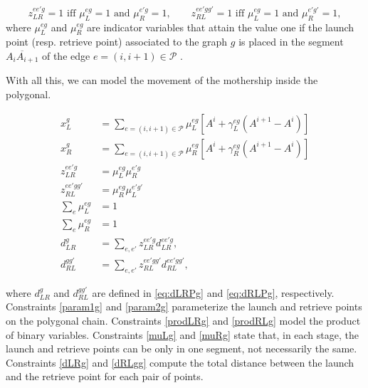 $$z_{LR}^{ee'g} = 1 \text{ iff } \mu_{L}^{eg} = 1 \text{ and }\mu_{R}^{e'g} = 1,\qquad
z_{RL}^{ee'gg'} = 1 \text{ iff } \mu_{L}^{eg} = 1 \text{ and }\mu_{R}^{e'g'} = 1,
$$
where $\mu_{L}^{eg}$ and $\mu_{R}^{eg}$ are indicator variables that attain the value one if the launch point (resp. retrieve point) associated to the graph $g$ is placed in the segment $\overline{A_iA_{i+1}}$ of the edge $e=(i, i+1) \in \mathcal P$ .

With all this, we can model the movement of the mothership inside the polygonal. 

\begin{align}
    x_L^g & = \sum_{e=(i, i+1)\in\mathcal P} \mu_{L}^{eg}\left[A^i + \gamma_L^{eg}(A^{i+1} - A^i)\right]\label{param1g}\\
    x_R^g & = \sum_{e=(i, i+1)\in\mathcal P} \mu_{R}^{eg}\left[ A^i + \gamma_R^{eg}(A^{i+1} - A^i)\right]\label{param2g}\\
    z_{LR}^{ee'g} & = \mu_{L}^{eg}\mu_{R}^{e'g}\label{prodLRg}\\
    z_{RL}^{ee'gg'} & = \mu_{R}^{eg}\mu_{L}^{e'g'}\label{prodRLg}\\
    \sum_{e} \mu_{L}^{eg} & = 1  \label{muLg} \\
    \sum_{e} \mu_{R}^{eg} & = 1 \label{muRg}\\
    d_{LR}^{g} & = \sum_{e, e'} z_{LR}^{ee'g} d_{LR}^{ee'g} \label{dLRg},\\
    d_{RL}^{gg'} & = \sum_{e, e'} z_{RL}^{ee'gg'} d_{RL}^{ee'gg'} \label{dRLgg},
\end{align}

\noindent where $d_{LR}^g$ and $d_{RL}^{gg'}$ are defined in \eqref{eq:dLRPg} and \eqref{eq:dRLPg}, respectively. Constraints \eqref{param1g} and \eqref{param2g} parameterize the launch and retrieve points on the polygonal chain. Constraints \eqref{prodLRg} and \eqref{prodRLg} model the product of binary variables. Constraints \eqref{muLg} and \eqref{muRg} state that, in each stage, the launch and retrieve points can be only in one segment, not necessarily the same. Constraints \eqref{dLRg} and \eqref{dRLgg} compute the total distance between the launch and the retrieve point for each pair of points. 

